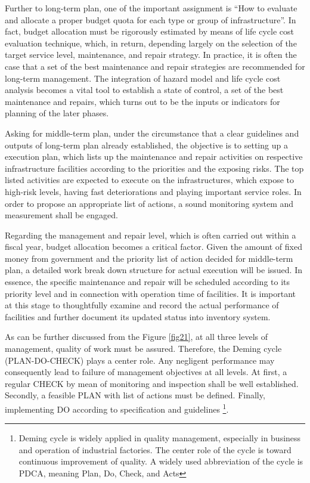 Further to long-term plan, one of the important assignment is ``How to evaluate and allocate a proper budget quota for each type or group of infrastructure''. In fact, budget allocation must be rigorously estimated by means of life cycle cost evaluation technique, which, in return, depending largely on the selection of the target service level, maintenance, and repair strategy. In practice, it is often the case that a set of the best maintenance and repair strategies are recommended for long-term management. The integration of hazard model and life cycle cost analysis becomes a vital tool to establish a state of control, a set of the best maintenance and repairs, which turns out to be the inputs or indicators for planning of the later phases.

Asking for middle-term plan, under the circumstance that a clear guidelines and outputs of long-term plan already established, the objective is to setting up a execution plan, which lists up the maintenance and repair activities on respective infrastructure facilities according to the priorities and the exposing risks. The top listed activities are expected to execute on the infrastructures, which expose to high-risk levels, having fast deteriorations and playing important service roles. In order to propose an appropriate list of actions, a sound monitoring system and measurement shall be engaged.

Regarding the management and repair level, which is often carried out within a fiscal year, budget allocation becomes a critical factor. Given the amount of fixed money from government and the priority list of action decided for middle-term plan, a detailed work break down structure for actual execution will be issued. In essence, the specific maintenance and repair will be scheduled according to its priority level and in connection with operation time of facilities. It is important at this stage to thoughtfully examine and record the actual performance of facilities and further document its updated status into inventory system.

As can be further discussed from the Figure \ref{fig21}, at all three levels of management, quality of work must be assured. Therefore, the Deming cycle \cite{deming} (PLAN-DO-CHECK) plays a center role. Any negligent performance may consequently lead to failure of management objectives at all levels. At first, a regular CHECK by mean of monitoring and inspection shall be well established. Secondly, a feasible PLAN with list of actions must be defined. Finally, implementing DO according to specification and guidelines \footnote{Deming cycle is widely applied in quality management, especially in business and operation of industrial factories. The center role of the cycle is toward continuous improvement of quality. A widely used abbreviation of the cycle is PDCA, meaning Plan, Do, Check, and Acts}.
